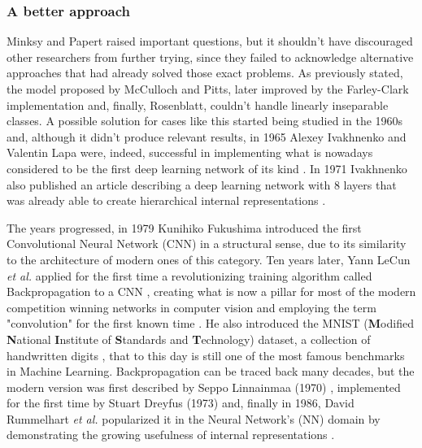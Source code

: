 \documentclass[class=report, crop=false, a4paper, 12pt]{standalone}
\begin{document}
\subsubsection{A better approach}
Minksy and Papert raised important questions, but it shouldn't have discouraged other researchers from further trying, since they failed to acknowledge alternative approaches that had already solved those exact problems. As previously stated, the model proposed by McCulloch and Pitts, later improved by the Farley-Clark implementation and, finally, Rosenblatt, couldn't handle linearly inseparable classes. A possible solution for cases like this started being studied in the 1960s \autocite{josephContributionsPerceptronTheory1960,rosenblattPrinciplesNeurodynamicsPerceptrons1962} and, although it didn't produce relevant results, in 1965 Alexey Ivakhnenko and Valentin Lapa \autocite{ivakhnenkoCyberneticPredictingDevices} were, indeed, successful in implementing what is nowadays considered to be the first deep learning network of its kind \autocite{schmidhuberDeepLearningNeural2015}. In 1971 Ivakhnenko also published an article describing a deep learning network with 8 layers that was already able to create hierarchical internal representations \autocite{4308320}.
\par The years progressed, in 1979 Kunihiko Fukushima introduced the first Convolutional Neural Network (CNN) in a structural sense, due to its similarity to the architecture of modern ones of this category. Ten years later, Yann LeCun \textit{et al.} applied for the first time a revolutionizing training algorithm called Backpropagation to a CNN \autocite{6795724}, creating what is now a pillar for most of the modern competition winning networks in computer vision \autocite{schmidhuberDeepLearningNeural2015} and employing the term "convolution" for the first known time \autocite{liSurveyConvolutionalNeural2022}. He also introduced the MNIST (\textbf{M}odified \textbf{N}ational \textbf{I}nstitute of \textbf{S}tandards and \textbf{T}echnology) dataset, a collection of handwritten digits \autocite{lecunGradientBasedLearningApplied1998}, that to this day is still one of the most famous benchmarks in Machine Learning. Backpropagation can be traced back many decades, but the modern version was first described by Seppo Linnainmaa (1970) \autocite{linnainmaa1970representation}, implemented for the first time by Stuart Dreyfus (1973) \autocite{Dreyfus1973383} and, finally in 1986, David Rummelhart \textit{et al.} popularized it in the Neural Network's (NN) domain by demonstrating the growing usefulness of internal representations \autocite{rumelhart1986learning}.
\end{document}
